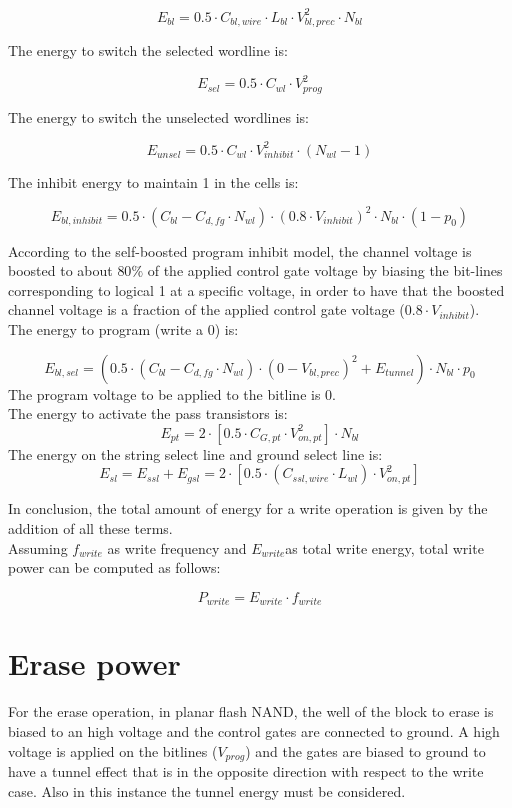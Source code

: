 \[
E_{bl}= 0.5 \cdot C_{bl,wire} \cdot L_{bl} \cdot V_{bl,prec}^2 \cdot N_{bl}
\]

The energy to switch the selected wordline is:

\[
E_{sel}=0.5 \cdot C_{wl} \cdot V_{prog}^2
\]

The energy to switch the unselected wordlines is:

\[
E_{unsel}=0.5 \cdot C_{wl} \cdot V_{inhibit}^2 \cdot (N_{wl}-1)
\]

The inhibit energy to maintain 1 in the cells is:

\[
E_{bl,inhibit}=0.5 \cdot (C_{bl}-C_{d,fg} \cdot N_{wl})\cdot (0.8 \cdot V_{inhibit})^2 \cdot N_{bl} \cdot (1-p_0)
\]

According to the self-boosted program inhibit model, the channel voltage is boosted to about $80\%$ of the applied control gate voltage by biasing the bit-lines corresponding to logical 1 at a specific voltage, in order to have that the boosted channel voltage is a fraction of the applied control gate voltage ($0.8 \cdot V_{inhibit}$).\\

The energy to program (write a 0) is:

\[
E_{bl,sel}= ( 0.5 \cdot (C_{bl}-C_{d,fg} \cdot N_{wl}) \cdot (0-V_{bl,prec})^2 + E_{tunnel}) \cdot N_{bl} \cdot p_0 
\]
The program voltage to be applied to the bitline is 0.\\


The energy to activate the pass transistors is:
\[
E_{pt}= 2 \cdot [0.5 \cdot C_{G,pt} \cdot V_{on,pt}^2] \cdot N_{bl}
\]
The energy on the string select line and ground select  line is:
\[
E_{sl}=E_{ssl}+ E_{gsl} = 2 \cdot [0.5 \cdot (C_{ssl,wire}\cdot L_{wl}) \cdot V_{on,pt}^2]
\]


In conclusion, the total amount of energy for a write operation is given by the addition of all these terms.\\
Assuming $f_{write}$ as write frequency and $E_{write}$as total write energy, total write power can be computed as follows:

\[
P_{write}=E_{write}\cdot f_{write}
\]


\section{Erase power}
\label{sec:erase_power}
For the erase operation, in planar flash NAND, the well of the block to erase is biased to an high voltage and the control gates are connected to ground. A high voltage is applied on the bitlines ($V_{prog}$) and the gates are biased to ground to have a tunnel effect that is in the opposite direction with respect to the write case. Also in this instance the tunnel energy must be considered.\\

